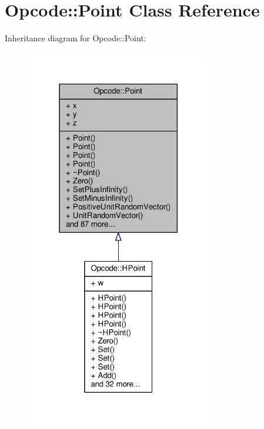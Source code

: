\hypertarget{classOpcode_1_1Point}{}\section{Opcode\+:\+:Point Class Reference}
\label{classOpcode_1_1Point}


Inheritance diagram for Opcode\+:\+:Point\+:
\nopagebreak
\begin{figure}[H]
\begin{center}
\leavevmode
\includegraphics[width=230pt]{d4/de3/classOpcode_1_1Point__inherit__graph}
\end{center}
\end{figure}


